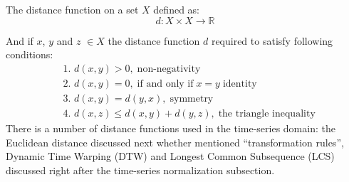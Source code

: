 The distance function on a set $X$ defined as:
\begin{equation}
 d: X \times X \rightarrow \mathbb{R}
\end{equation}

And if $x$, $y$ and $z$ $\in X$ the distance function $d$ required to satisfy following conditions:
\begin{align}
 & \text{1. } d(x, y) > 0, \; \text{non-negativity} \label{eq:d1} \\
 & \text{2. } d(x, y) = 0, \; \text{if and only if} \; x = y  \;  \text{identity} \\
 & \text{3. } d(x, y) = d(y, x), \; \text{symmetry} \\
 & \text{4. } d(x, z) \leq d(x, y) + d(y, z), \; \text{the triangle inequality} \label{eq:d4}
\end{align}
There is a number of distance functions used in the time-series domain: the Euclidean distance discussed next whether mentioned ``transformation rules'', Dynamic Time Warping (DTW) and Longest Common Subsequence (LCS) discussed right after the time-series normalization subsection.
